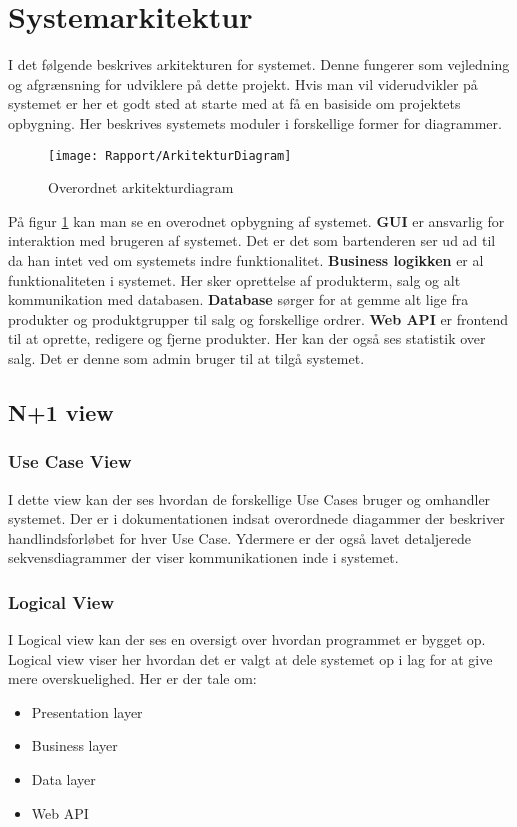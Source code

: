 \section{Systemarkitektur}

I det følgende beskrives arkitekturen for systemet. Denne fungerer som vejledning og afgrænsning for udviklere på dette projekt. Hvis man vil viderudvikler på systemet er her et godt sted at starte med at få en basiside om projektets opbygning.\newline
Her beskrives systemets moduler i forskellige former for diagrammer. 

\begin{figure}[H]
	\centering
	\texttt{[image: Rapport/ArkitekturDiagram]}
	\caption{Overordnet arkitekturdiagram}
	\label{ArkiDia}
\end{figure}

På figur \ref{ArkiDia} kan man se en overodnet opbygning af systemet. \textbf{GUI} er ansvarlig for interaktion med brugeren af systemet. Det er det som bartenderen ser ud ad til da han intet ved om systemets indre funktionalitet.\newline
\textbf{Business logikken} er al funktionaliteten i systemet. Her sker oprettelse af produkterm, salg og alt kommunikation med databasen. 
\textbf{Database} sørger for at gemme alt lige fra produkter og produktgrupper til salg og forskellige ordrer.\newline
\textbf{Web API} er frontend til at oprette, redigere og fjerne produkter. Her kan der også ses statistik over salg. Det er denne som admin bruger til at tilgå systemet. 

\subsection{N+1 view}

\subsubsection{Use Case View}
I dette view kan der ses hvordan de forskellige Use Cases bruger og omhandler systemet. Der er i dokumentationen indsat overordnede diagammer der beskriver handlindsforløbet for hver Use Case. Ydermere er der også lavet detaljerede sekvensdiagrammer der viser kommunikationen inde i systemet. \newline

\subsubsection{Logical View}
I Logical view kan der ses en oversigt over hvordan programmet er bygget op. Logical view viser her hvordan det er valgt at dele systemet op i lag for at give mere overskuelighed. Her er der tale om:\newline
\begin{itemize}
	\item Presentation layer
	\item Business layer
	\item Data layer
	\item Web API
\end{itemize}
 
